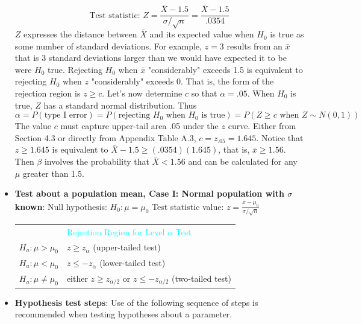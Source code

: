 \documentclass{report}
\begin{document}
\begin{itemize}
    \[
        \text{Test statistic: } Z = \frac{\bar{X} - 1.5}{\sigma/\sqrt{n}} = \frac{\bar{X} - 1.5}{.0354}
    \]
    \( Z \) expresses the distance between \( \bar{X} \) and its expected value when \( H_0 \) is true as some number of standard deviations. For example, \( z = 3 \) results from an \( \bar{x} \) that is 3 standard deviations larger than we would have expected it to be were \( H_0 \) true.
    \bigbreak \noindent 
    Rejecting \( H_0 \) when \( \bar{x} \) "considerably" exceeds 1.5 is equivalent to rejecting \( H_0 \) when \( z \) "considerably" exceeds 0. That is, the form of the rejection region is \( z \geq c \). Let's now determine \( c \) so that \( \alpha = .05 \). When \( H_0 \) is true, \( Z \) has a standard normal distribution. Thus
    \[
        \alpha = P(\text{type I error}) = P(\text{rejecting } H_0 \text{ when } H_0 \text{ is true}) = P(Z \geq c \text{ when } Z \sim N(0, 1))
    \]
    The value \( c \) must capture upper-tail area .05 under the \( z \) curve. Either from Section 4.3 or directly from Appendix Table A.3, \( c = z_{.05} = 1.645 \).
    \bigbreak \noindent 
    Notice that \( z \geq 1.645 \) is equivalent to \( \bar{X} - 1.5 \geq (.0354)(1.645) \), that is, \( \bar{x} \geq 1.56 \). Then \( \beta \) involves the probability that \( \bar{X} < 1.56 \) and can be calculated for any \( \mu \) greater than 1.5.
\item \textbf{Test about a population mean, Case I: Normal population with $\sigma$ known}:
    \bigbreak \noindent 
    Null hypothesis: \( H_0: \mu = \mu_0 \)
    \bigbreak \noindent 
    Test statistic value: \( z = \frac{\bar{x} - \mu_0}{\sigma / \sqrt{n}} \)
    \bigbreak \noindent 
    \begin{tabular}{>{\bfseries}l l}
        \multicolumn{1}{l}{\textcolor{cyan}{Alternative Hypothesis}} & \multicolumn{1}{l}{\textcolor{cyan}{Rejection Region for Level \(\alpha\) Test}} \\
        $H_a: \mu > \mu_0$ & $z \ge z_{\alpha}$ \quad (upper-tailed test) \\
        $H_a: \mu < \mu_0$ & $z \le -z_{\alpha}$ \quad (lower-tailed test) \\
        $H_a: \mu \neq \mu_0$ & either $z \ge z_{\alpha/2}$ or $z \le -z_{\alpha/2}$ \quad (two-tailed test) \\
    \end{tabular}
    \bigbreak \noindent 
    \bigbreak \noindent 
\item \textbf{Hypothesis test steps}: Use of the following sequence of steps is recommended when testing hypotheses about a parameter.

\end{itemize}
\end{document}
